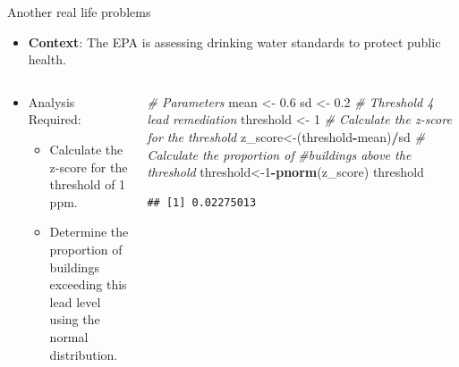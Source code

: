 \documentclass[
  ignorenonframetext,
]{beamer}
\newenvironment{Shaded}{\begin{snugshade}}{\end{snugshade}}
\newcommand{\CommentTok}[1]{\textcolor[rgb]{0.56,0.35,0.01}{\textit{#1}}}
\newcommand{\DecValTok}[1]{\textcolor[rgb]{0.00,0.00,0.81}{#1}}
\newcommand{\FloatTok}[1]{\textcolor[rgb]{0.00,0.00,0.81}{#1}}
\newcommand{\FunctionTok}[1]{\textcolor[rgb]{0.13,0.29,0.53}{\textbf{#1}}}
\newcommand{\NormalTok}[1]{#1}
\newcommand{\OtherTok}[1]{\textcolor[rgb]{0.56,0.35,0.01}{#1}}
\newcommand{\SpecialCharTok}[1]{\textcolor[rgb]{0.81,0.36,0.00}{\textbf{#1}}}
\providecommand{\tightlist}{%
  \setlength{\itemsep}{0pt}\setlength{\parskip}{0pt}}
\begin{document}
\begin{frame}[fragile]{Another real life problems}
\label{another-real-life-problems-2}
\small

\begin{itemize}
\tightlist
\item
  \textbf{Context}: The EPA is assessing drinking water standards to
  protect public health.\\
\end{itemize}

\begin{columns}[T]
\begin{column}{0.5\textwidth}
\small

\begin{itemize}
\tightlist
\item
  Analysis Required:

  \begin{itemize}
  \tightlist
  \item
    Calculate the z-score for the threshold of 1 ppm.
  \item
    Determine the proportion of buildings exceeding this lead level
    using the normal distribution.\\
  \end{itemize}
\end{itemize}
\end{column}

\begin{column}{0.5\textwidth}
\begin{Shaded}
\begin{Highlighting}[]
\CommentTok{\# Parameters}
\NormalTok{mean }\OtherTok{\textless{}{-}} \FloatTok{0.6}
\NormalTok{sd }\OtherTok{\textless{}{-}} \FloatTok{0.2}
\CommentTok{\# Threshold 4 lead remediation}
\NormalTok{threshold }\OtherTok{\textless{}{-}} \DecValTok{1}
\CommentTok{\# Calculate the z{-}score for the threshold}
\NormalTok{z\_score}\OtherTok{\textless{}{-}}\NormalTok{(threshold}\SpecialCharTok{{-}}\NormalTok{mean)}\SpecialCharTok{/}\NormalTok{sd}
\CommentTok{\# Calculate the proportion of }
\CommentTok{\#buildings above the threshold}
\NormalTok{threshold}\OtherTok{\textless{}{-}}\DecValTok{1}\SpecialCharTok{{-}}\FunctionTok{pnorm}\NormalTok{(z\_score)}
\NormalTok{threshold}
\end{Highlighting}
\end{Shaded}

\begin{verbatim}
## [1] 0.02275013
\end{verbatim}
\end{column}
\end{columns}
\end{frame}

\begin{frame}{}
\label{section}
\end{frame}
\end{document}
